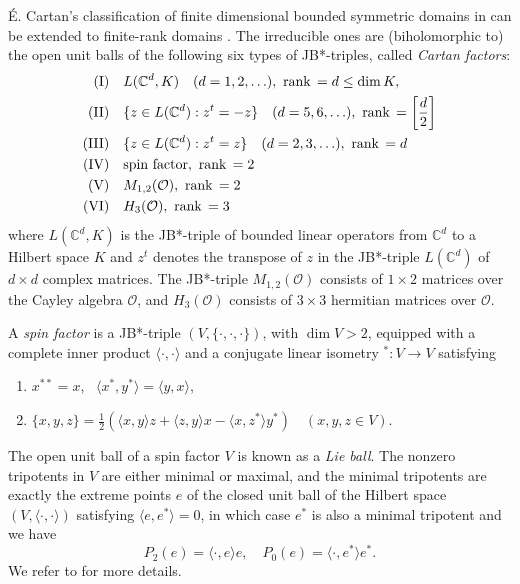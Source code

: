 \documentclass[12pt, twoside]{article}
\def\q{\quad}
\theoremstyle{definition}
\numberwithin{equation}{section}
\begin{document}
\'E. Cartan's classification of finite dimensional bounded symmetric domains in \cite{cartan} can be extended to
finite-rank domains \cite[Theorem 3.3.5;(3.31)]{book2}.
 The irreducible ones are (biholomorphic to) the open unit balls of the following six types of JB*-triples,
 called {\it Cartan factors}:
\begin{equation*}%
\begin{aligned}
{\rm (I)} &\q {L}(\mathbb{C}^d,K)\q (d =1,2, \ldots),~ {\rm rank}\,= d\leq \dim K,\q \\
\text{\rm (II)} &\q
\{z\in {L}(\mathbb{C}^d): z^t=-z\}\q (d = 5,6,  \ldots),~ {\rm rank}\,=\left[\frac{d}{2}\right]\\
\text{\rm (III)} &\q  \{z\in
{L}(\mathbb{C}^d): z^t=z\} \q (d = 2,3,  \ldots),~ {\rm rank}\,= d\\
\text{\rm (IV)} &\q \text{\rm spin
factor},~ {\rm rank}\,= 2\\
\text{\rm (V)} &\q M_{1,2}(\mathcal{O}),~ {\rm rank}\,= 2\\
\text{\rm (VI)} &\q H_3(\mathcal{O}),~ {\rm rank}\,= 3
\end{aligned}
\end{equation*}
where ${L}(\mathbb{C}^d,K)$ is the JB*-triple of bounded linear
operators from $\mathbb{C}^d$ to a Hilbert space $K$ and
$z^t$ denotes
the transpose of $z$ in the JB*-triple ${L}(\mathbb{C}^d) $
of $d \times d$ complex matrices. %
The JB*-triple $M_{1,2}(\mathcal{O})$ consists of $1 \times 2$ matrices over the Cayley algebra $\mathcal{O}$,
and $H_3(\mathcal{O})$ consists of $3 \times 3$ hermitian matrices over $\mathcal{O}$.

A {\it spin factor} is a JB*-triple $(V, \{\cdot,\cdot,\cdot\})$, with $\dim V>2$,  equipped with a complete inner product $\langle \cdot,\cdot\rangle$
and a conjugate linear isometry $^*: V \longrightarrow V$ satisfying
\begin{enumerate}
\item[\rm (i)] $x^{**} = x$,~ $\langle x^*, y^*\rangle = \langle y, x\rangle$,
\item[\rm (ii)] $\{x,y,z\} = \frac{1}{2}(\langle x,y\rangle z+ \langle z,y\rangle x - \langle x, z^*\rangle y^*) \quad (x,y,z \in V)$.
\end{enumerate}
The open unit ball of a spin factor $V$ is known as a {\it Lie ball}.
The nonzero tripotents in  $V$ are either minimal or maximal, and the minimal tripotents are exactly
the extreme points $e$ of the closed unit ball of the Hilbert space $(V, \langle \cdot,\cdot\rangle)$ satisfying
$\langle e,e^*\rangle =0$, in which case $e^*$ is also a minimal tripotent and we have
\begin{equation}\label{spin}
P_2(e)= \langle \cdot, e\rangle e, \quad P_0(e)= \langle \cdot, e^*\rangle e^*. %
\end{equation}
We refer to \cite[3.3]{book2} for more details.
\end{document}
